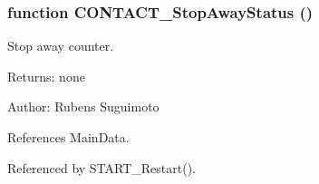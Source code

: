 \subsubsection[CONTACT\_\-StopAwayStatus]{\setlength{\rightskip}{0pt plus 5cm}function CONTACT\_\-StopAwayStatus ()}\label{status_8js_50a35e8e341e7c61b162e6935564d47c}


Stop away counter. 

\begin{Desc}
\item[Returns:]none \end{Desc}
\begin{Desc}
\item[Author:]Rubens Suguimoto \end{Desc}


References MainData.

Referenced by START\_\-Restart().